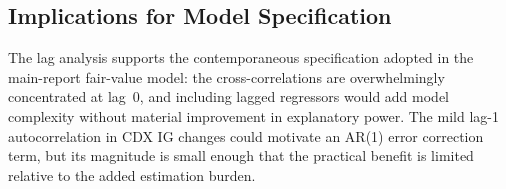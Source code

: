 \subsection*{Implications for Model Specification}

The lag analysis supports the contemporaneous specification adopted in the
main-report fair-value model: the cross-correlations are overwhelmingly
concentrated at lag~0, and including lagged regressors would add model
complexity without material improvement in explanatory power. The mild
lag-1 autocorrelation in CDX IG changes could motivate an AR(1) error
correction term, but its magnitude is small enough that the practical benefit
is limited relative to the added estimation burden.
